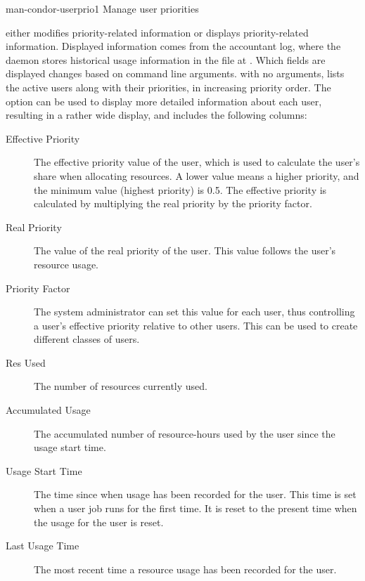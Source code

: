 \begin{ManPage}{}{man-condor-userprio}{1}
{Manage user priorities} 

\Synopsis {}

 \Bar{} 

\Description 
{} either modifies priority-related information
or displays priority-related information.
Displayed information comes from the accountant log,
where the  daemon stores historical usage information
in the file at .
Which fields are displayed changes based on command line arguments.
 with no arguments, 
lists the active users along with their priorities,
in increasing priority order. 
The  option can be used to display
more detailed information about each user, 
resulting in a rather wide display,
and includes the following columns:

\begin{description}
\item[Effective Priority] The effective priority value of the user, 
which is used to calculate the user's share when allocating resources. 
A lower value means a higher priority, 
and the minimum value (highest priority) is 0.5. 
The effective priority is
calculated by multiplying the real priority by the priority factor.
\item[Real Priority] The value of the real priority of the user. 
This value follows the user's resource usage.
\item[Priority Factor] The system administrator can set this value 
for each user, 
thus controlling a user's effective priority relative to other users. 
This can be used to create different classes of users.
\item[Res Used] The number of resources currently used. 
\item[Accumulated Usage] The accumulated number of resource-hours 
used by the user since the usage start time.
\item[Usage Start Time] The time since when usage has been recorded 
for the user. 
This time is set when a user job runs for the first time. 
It is reset to the present time when the
usage for the user is reset.
\item[Last Usage Time] The most recent time a resource usage has been recorded 
for the user.
\end{description}


\end{ManPage}
